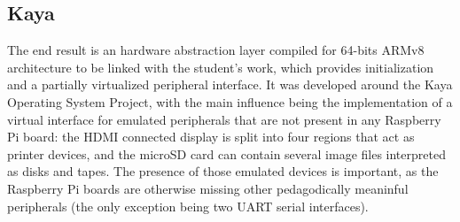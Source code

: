 \documentclass[12pt,a4paper,openright,twoside]{report}
\begin{document}
\subsection{Kaya}
The end result is an hardware abstraction layer compiled for 64-bits ARMv8
architecture to be linked with the student's work, which provides initialization
and a partially virtualized peripheral interface.
It was developed around the Kaya Operating System Project, with the main influence
being the implementation of a virtual interface for emulated peripherals that
are not present in any Raspberry Pi board: the HDMI connected display is split 
into four regions that act as printer devices, and the microSD card can contain
several image files interpreted as disks and tapes.
The presence of those emulated devices is important, as the Raspberry Pi boards
are otherwise missing other pedagodically meaninful peripherals (the only
exception being two UART serial interfaces).
\end{document}
